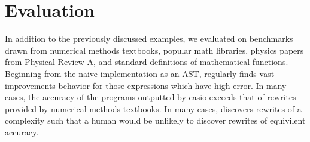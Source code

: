 \documentclass[paper.tex]{subfiles}
\begin{document}
\section{Evaluation}


In addition to the previously discussed examples,
we evaluated \casio on benchmarks drawn from
numerical methods textbooks, popular math libraries, 
physics papers from Physical Review A, and standard definitions of mathematical functions.
Beginning from the naive implementation as an AST,
\casio regularly finds vast improvements behavior for those expressions which have high error.
In many cases, the accuracy of the programs outputted by casio 
exceeds that of rewrites provided by numerical methods textbooks.
In many cases, \casio discovers rewrites of a complexity 
such that a human would be unlikely to discover rewrites of equivilent accuracy.
\end{document}
